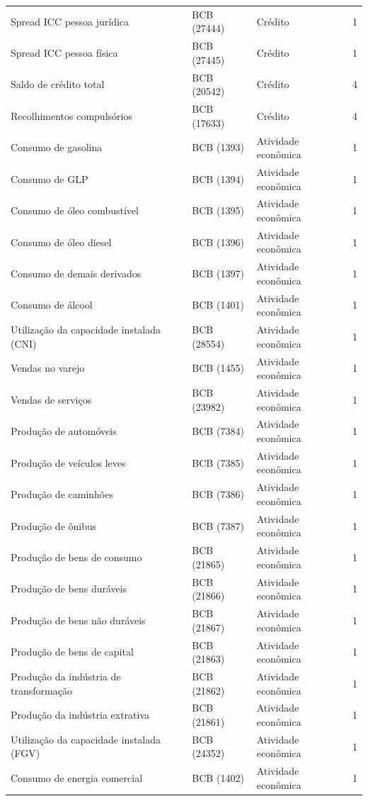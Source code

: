 \documentclass[
article,			%
12pt,				%
oneside,			%
a4paper,			%
hidelinks, 
english,			%
brazil,				%
]{abntex2}
\theoremstyle{plain}
\theoremstyle{definition}
\theoremstyle{remark}
\begin{document}
\begin{anexosenv}
\begin{ThreePartTable}
\begin{longtable}{@{}p{5.2cm} l l c@{}}
Spread ICC pessoa jurídica & BCB (27444) & Crédito & 1 \\
Spread ICC pessoa física & BCB (27445) & Crédito & 1 \\
Saldo de crédito total & BCB (20542) & Crédito & 4 \\
Recolhimentos compulsórios & BCB (17633) & Crédito & 4 \\
Consumo de gasolina & BCB (1393) & Atividade econômica & 1 \\
Consumo de GLP & BCB (1394) & Atividade econômica & 1 \\
Consumo de óleo combustível & BCB (1395) & Atividade econômica & 1 \\
Consumo de óleo diesel & BCB (1396) & Atividade econômica & 1 \\
Consumo de demais derivados & BCB (1397) & Atividade econômica & 1 \\
Consumo de álcool & BCB (1401) & Atividade econômica & 1 \\
Utilização da capacidade instalada (CNI) & BCB (28554) & Atividade econômica & 1 \\
Vendas no varejo & BCB (1455) & Atividade econômica & 1 \\
Vendas de serviços & BCB (23982) & Atividade econômica & 1 \\
Produção de automóveis & BCB (7384) & Atividade econômica & 1 \\
Produção de veículos leves & BCB (7385) & Atividade econômica & 1 \\
Produção de caminhões & BCB (7386) & Atividade econômica & 1 \\
Produção de ônibus & BCB (7387) & Atividade econômica & 1 \\
Produção de bens de consumo & BCB (21865) & Atividade econômica & 1 \\
Produção de bens duráveis & BCB (21866) & Atividade econômica & 1 \\
Produção de bens não duráveis & BCB (21867) & Atividade econômica & 1 \\
Produção de bens de capital & BCB (21863) & Atividade econômica & 1 \\
Produção da indústria de transformação & BCB (21862) & Atividade econômica & 1 \\
Produção da indústria extrativa & BCB (21861) & Atividade econômica & 1 \\
Utilização da capacidade instalada (FGV) & BCB (24352) & Atividade econômica & 1 \\
Consumo de energia comercial & BCB (1402) & Atividade econômica & 1 \\

\end{longtable}
\end{ThreePartTable}
\end{anexosenv}
\end{document}
